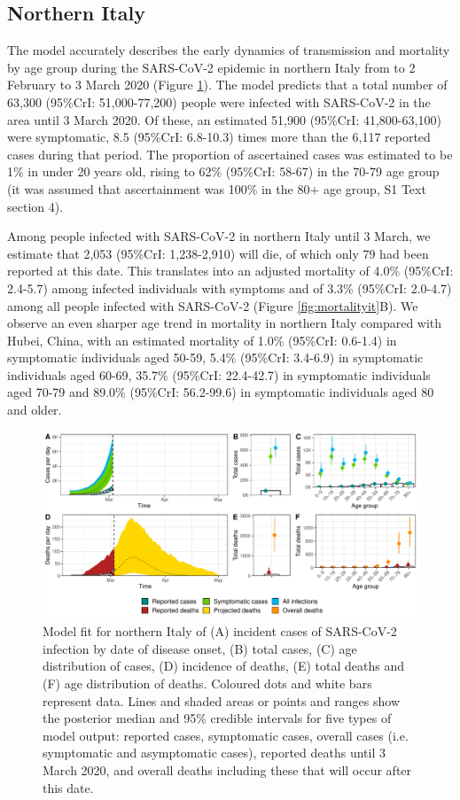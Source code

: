 \documentclass{article}
\begin{document}
\subsection*{Northern Italy}

The model accurately describes the early dynamics of transmission and mortality by age group during the SARS-CoV-2 epidemic in northern Italy from to 2 February to 3 March 2020 (Figure \ref{fig:fitit}). 
The model predicts that a total number of 63,300 (95\%CrI: 51,000-77,200) people were infected with SARS-CoV-2 in the area until 3 March 2020.
Of these, an estimated 51,900 (95\%CrI: 41,800-63,100) were symptomatic, 8.5 (95\%CrI: 6.8-10.3) times more than the 6,117 reported cases during that period.
The proportion of ascertained cases was estimated to be 1\% in under 20 years old, rising to 62\% (95\%CrI: 58-67) in the 70-79 age group (it was assumed that ascertainment was 100\% in the 80+ age group, S1 Text section 4).

Among people infected with SARS-CoV-2 in northern Italy until 3 March, we estimate that 2,053 (95\%CrI: 1,238-2,910) will die, of which only 79 had been reported at this date.
This translates into an adjusted mortality of 4.0\% (95\%CrI: 2.4-5.7) among infected individuals with symptoms and of 3.3\% (95\%CrI: 2.0-4.7) among all people infected with SARS-CoV-2 (Figure \ref{fig:mortalityit}B).
We observe an even sharper age trend in mortality in northern Italy compared with Hubei, China, with an estimated mortality of 1.0\% (95\%CrI: 0.6-1.4) in symptomatic individuals aged 50-59, 5.4\% (95\%CrI: 3.4-6.9) in symptomatic individuals aged 60-69, 35.7\% (95\%CrI: 22.4-42.7) in symptomatic individuals aged 70-79 and 89.0\% (95\%CrI: 56.2-99.6) in symptomatic individuals aged 80 and older. 

\begin{figure}[h]
	\includegraphics[width=\linewidth]{../format_output/figures/modelfit_italy.pdf}
	\caption{Model fit for northern Italy of (A) incident cases of SARS-CoV-2 infection by date of disease onset, (B) total cases, (C) age distribution of cases, (D) incidence of deaths, (E) total deaths and (F) age distribution of deaths. Coloured dots and white bars represent data. Lines and shaded areas or points and ranges show the posterior median and 95\% credible intervals for five types of model output: reported cases, symptomatic cases, overall cases (i.e. symptomatic and asymptomatic cases), reported deaths until 3 March 2020, and overall deaths including these that will occur after this date.}
	\label{fig:fitit}
\end{figure}
\end{document}
